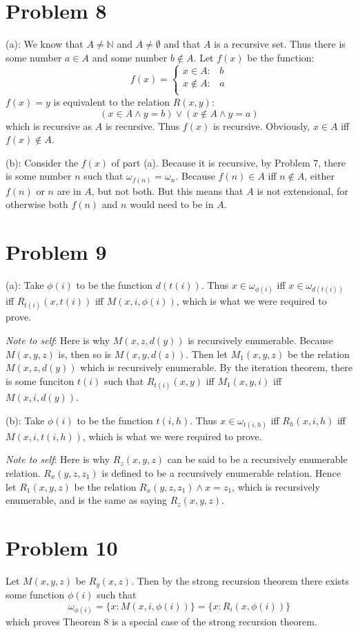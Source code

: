 \documentclass{article}
\newcommand{\N}{\mathbb{N}}
\theoremstyle{definition}
\begin{document}
\section*{Problem 8}
(a): We know that $A\ne\N$ and $A\ne\emptyset$ and that $A$ is a recursive set. Thus there is some number $a\in A$ and some number $b\notin A$. Let $f(x)$ be the function:
\[ f(x)=\begin{cases}
	x\in A: & b \\
	x\notin A: & a \\
	\end{cases}
\]
$f(x)=y$ is equivalent to the relation $R(x,y)$: \[ (x\in A\wedge y=b)\vee (x\notin A\wedge y=a) \] which is recursive as $A$ is recursive. Thus $f(x)$ is recursive. Obviously, 
$x\in A$ iff $f(x)\notin A$.


(b): Consider the $f(x)$ of part (a). Because it is recursive, by Problem 7, there is some number $n$ such that $\omega_{f(n)}=\omega_n$. Because $f(n)\in A$ iff $n\notin A$, 
either 
$f(n)$ or $n$ are in $A$, but not both. But this means that $A$ is not extensional, for otherwise both $f(n)$ and $n$ would need to be in $A$.

\section*{Problem 9}
(a): Take $\phi(i)$ to be the function $d(t(i))$. Thus $x\in\omega_{\phi(i)}$ iff $x\in\omega_{d(t(i))}$ iff $R_{t(i)}(x,t(i))$ iff $M(x,i,\phi(i))$, which is what 
we were required to prove.


\textit{Note to self}: Here is why $M(x,z,d(y))$ is recursively enumerable. Because $M(x,y,z)$ is, then so is $M(x,y,d(z))$. Then let $M_1(x,y,z)$ be the relation 
$M(x,z,d(y))$ which is recursively enumerable. By the iteration theorem, there is some funciton $t(i)$ such that $R_{t(i)}(x,y)$ iff 
$M_1(x,y,i)$ iff $M(x,i,d(y))$.


(b): Take $\phi(i)$ to be the function $t(i,h)$. Thus $x\in\omega_{t(i,h)}$ iff $R_h(x,i,h)$ iff $M(x,i,t(i,h))$, which is what we were required to prove.


\textit{Note to self}: Here is why $R_z(x,y,z)$ can be said to be a recursively enumerable relation. $R_x(y,z,z_1)$ is defined to be a recursively enumerable relation. 
Hence let $R_1(x,y,z)$ be the relation $R_x(y,z,z_1)\wedge x=z_1$, which is recursively enumerable, and is the same as saying $R_z(x,y,z)$.

\section*{Problem 10}
Let $M(x,y,z)$ be $R_y(x,z)$. Then by the strong recursion theorem there exists some function $\phi(i)$ such that 
\[ \omega_{\phi(i)}=\{x:M(x,i,\phi(i))\}=\{x:R_i(x,\phi(i))\} \] which proves Theorem 8 is a special case of the strong recursion theorem.
\end{document}
